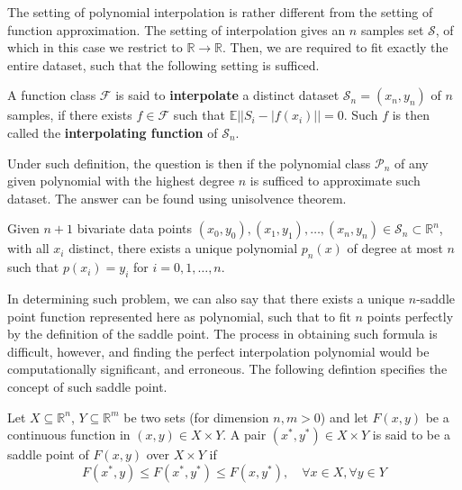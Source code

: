The setting of polynomial interpolation is rather different from the setting of function approximation. The setting of interpolation gives an $n$ samples set $\mathcal{S}$, of which in this case we restrict to $\mathbb{R}\to\mathbb{R}$. Then, we are required to fit exactly the entire dataset, such that the following setting is sufficed. 
\begin{definition}[Interpolation]
    A function class $\mathcal{F}$ is said to \textbf{interpolate} a distinct dataset $\mathcal{S}_{n}=(x_{n},y_{n})$ of $n$ samples, if there exists $f\in \mathcal{F}$ such that $\mathbb{E}||S_{i}-|f(x_{i})||= 0$. Such $f$ is then called the \textbf{interpolating function} of $\mathcal{S}_{n}$. 
\end{definition}
Under such definition, the question is then if the polynomial class $\mathcal{P}_{n}$ of any given polynomial with the highest degree $n$ is sufficed to approximate such dataset. The answer can be found using unisolvence theorem.

\begin{theorem}
    Given $n+1$ bivariate data points $(x_{0},y_{0}),(x_{1},y_{1}),\dots,(x_{n},y_{n})\in \mathcal{S}_{n}\subset \mathbb{R}^{n}$, with all $x_{i}$ distinct, there exists a unique polynomial $p_{n}(x)$ of degree at most $n$ such that $p(x_{i})=y_{i}$ for $i=0,1,\dots,n$.
\end{theorem}

In determining such problem, we can also say that there exists a unique $n$-saddle point function represented here as polynomial, such that to fit $n$ points perfectly by the definition of the saddle point. The process in obtaining such formula is difficult, however, and finding the perfect interpolation polynomial would be computationally significant, and erroneous. The following defintion specifies the concept of such saddle point. 

\begin{definition}
    Let $X\subseteq \mathbb{R}^{n}$, $Y\subseteq \mathbb{R}^{m}$ be two sets (for dimension $n,m>0$) and let $F(x,y)$ be a continuous function in $(x,y)\in X\times Y$. A pair $(x^{*},y^{*})\in X\times Y$ is said to be a saddle point of $F(x,y)$ over $X\times Y$ if \begin{equation}
        F(x^{*},y) \leq F(x^{*},y^{*})\leq F(x,y^{*}), \quad \forall x\in X, \forall y\in Y
    \end{equation}
\end{definition}


